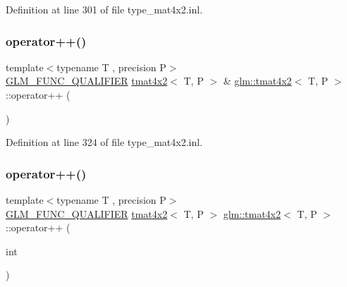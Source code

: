 Definition at line 301 of file type\+\_\+mat4x2.\+inl.

\mbox{\label{structglm_1_1tmat4x2_aa4dfd99c24f9e86e7b3de9c0a2cb99ab}} 
\subsubsection{\texorpdfstring{operator++()}{operator++()}\hspace{0.1cm}{\footnotesize\ttfamily [1/2]}}
{\footnotesize\ttfamily template$<$typename T , precision P$>$ \\
\mbox{\hyperlink{setup_8hpp_a33fdea6f91c5f834105f7415e2a64407}{G\+L\+M\+\_\+\+F\+U\+N\+C\+\_\+\+Q\+U\+A\+L\+I\+F\+I\+ER}} \mbox{\hyperlink{structglm_1_1tmat4x2}{tmat4x2}}$<$ T, P $>$ \& \mbox{\hyperlink{structglm_1_1tmat4x2}{glm\+::tmat4x2}}$<$ T, P $>$\+::operator++ (\begin{DoxyParamCaption}{ }\end{DoxyParamCaption})}



Definition at line 324 of file type\+\_\+mat4x2.\+inl.

\mbox{\label{structglm_1_1tmat4x2_af0211253087f7df4afb95aeba8daef24}} 
\subsubsection{\texorpdfstring{operator++()}{operator++()}\hspace{0.1cm}{\footnotesize\ttfamily [2/2]}}
{\footnotesize\ttfamily template$<$typename T , precision P$>$ \\
\mbox{\hyperlink{setup_8hpp_a33fdea6f91c5f834105f7415e2a64407}{G\+L\+M\+\_\+\+F\+U\+N\+C\+\_\+\+Q\+U\+A\+L\+I\+F\+I\+ER}} \mbox{\hyperlink{structglm_1_1tmat4x2}{tmat4x2}}$<$ T, P $>$ \mbox{\hyperlink{structglm_1_1tmat4x2}{glm\+::tmat4x2}}$<$ T, P $>$\+::operator++ (\begin{DoxyParamCaption}\item[{int}]{ }\end{DoxyParamCaption})}



